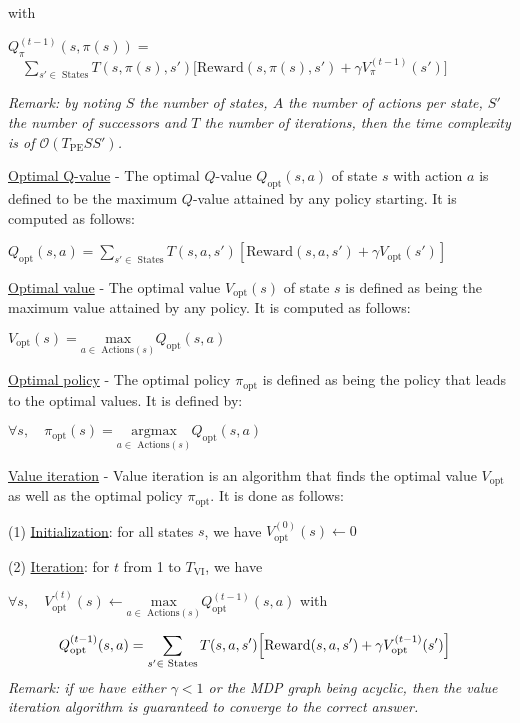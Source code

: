 \documentclass[4pt,landscape]{article}
\begin{document}
\begin{multicols*}{4}
with

$Q_\pi^{(t-1)}(s,\pi(s))=$\\$\quad\displaystyle\sum_{s'\in\textrm{ States}}T(s,\pi(s),s')\Big[\textrm{Reward}(s,\pi(s),s')+\gamma V_\pi^{(t-1)}(s')\Big]$\par
{\textit{Remark: by noting $S$ the number of states, $A$ the number of actions per state, $S'$ the number of successors and $T$ the number of iterations, then the time complexity is of $\mathcal{O}(T_{\textrm{PE}}SS')$.}}\par

{\underline{Optimal Q-value} - The optimal $Q$-value $Q_{\textrm{opt}}(s,a)$ of state $s$ with action $a$ is defined to be the maximum $Q$-value attained by any policy starting. It is computed as follows:}\par

${Q_{\textrm{opt}}(s,a)=\sum_{s'\in\textrm{ States}}T(s,a,s')\left[\textrm{Reward}(s,a,s')+\gamma V_\textrm{opt}(s')\right]}$


{\underline{Optimal value} - The optimal value $V_{\textrm{opt}}(s)$ of state $s$ is defined as being the maximum value attained by any policy. It is computed as follows:}\par

${V_{\textrm{opt}}(s)=\underset{a\in\textrm{ Actions}(s)}{\textrm{max}}Q_\textrm{opt}(s,a)}$


{\underline{Optimal policy} - The optimal policy $\pi_{\textrm{opt}}$ is defined as being the policy that leads to the optimal values. It is defined by:}\par

$\forall s,\quad{\pi_{\textrm{opt}}(s)=\underset{a\in\textrm{ Actions}(s)}{\textrm{argmax}}Q_\textrm{opt}(s,a)}$


{\underline{Value iteration} - Value iteration is an algorithm that finds the optimal value $V_{\textrm{opt}}$ as well as the optimal policy $\pi_{\textrm{opt}}$. It is done as follows:

(1) \underline{Initialization}: for all states $s$, we have $V_{\textrm{opt}}^{(0)}(s)\longleftarrow0$

(2) \underline{Iteration}: for $t$ from 1 to $T_{\textrm{VI}}$, we have

$\forall s,\quad{V_\textrm{opt}^{(t)}(s)\longleftarrow \underset{a\in\textrm{ Actions}(s)}{\textrm{max}}Q_\textrm{opt}^{(t-1)}(s,a)}$ with}
$$\hspace{-0.25cm}Q_\textrm{opt}^{(t-1)}(s,a)=\sum_{s'\in\textrm{ States}}T(s,a,s')\Big[\textrm{Reward}(s,a,s')+\gamma V_\textrm{opt}^{(t-1)}(s')\Big]$$	
{\textit{Remark: if we have either $\gamma < 1$ or the MDP graph being acyclic, then the value iteration algorithm is guaranteed to converge to the correct answer.}}\par


\end{multicols*}
\end{document}
